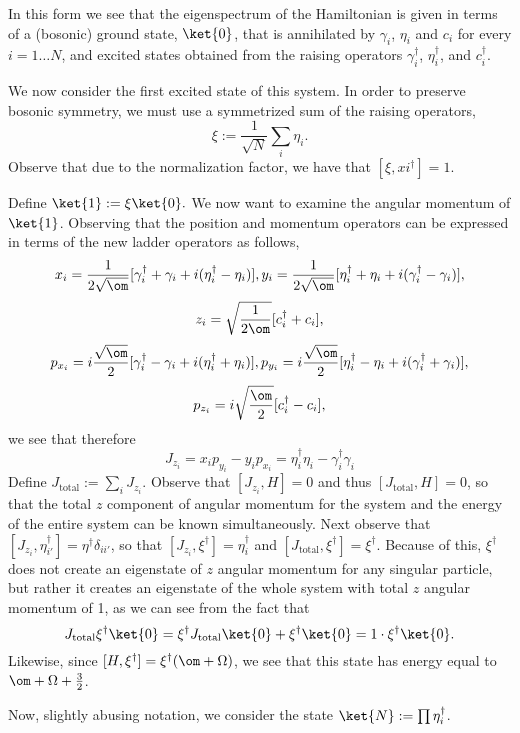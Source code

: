 \documentclass{article}
\begin{document}
In this form we see that the eigenspectrum of the Hamiltonian is given in terms of a (bosonic) ground state, $\ket{0}$, that is annihilated by $\gamma_i$, $\eta_i$ and $c_i$ for every $i=1\dots N$, and excited states obtained from the raising operators $\gamma_i^\dagger$, $\eta_i^\dagger$, and $c_i^\dagger$.

We now consider the first excited state of this system.  In order to preserve bosonic symmetry, we must use a symmetrized sum of the raising operators,
$$\xi := \frac{1}{\sqrt{N}}\sum_i \eta_i.$$  Observe that due to the normalization factor, we have that $[\xi,xi^\dagger] = 1$.

Define $\ket{1}:= \xi\ket{0}.$  We now want to examine the angular momentum of $\ket{1}$.  Observing that the position and momentum operators can be expressed in terms of the new ladder operators as follows,
$$
x_i = \frac{1}{2\sqrt{\om}}[\gamma_i^\dagger + \gamma_i+ i(\eta_i^\dagger-\eta_i)],
y_i = \frac{1}{2\sqrt{\om}}[\eta_i^\dagger + \eta_i+ i(\gamma_i^\dagger-\gamma_i)],
$$
$$
z_i = \sqrt{\frac{1}{2\om}}[c_i^\dagger + c_i],
$$
$$
p_{x_i} = i\frac{\sqrt{\om}}{2}[\gamma_i^\dagger - \gamma_i + i(\eta_i^\dagger + \eta_i)],
p_{y_i} =i\frac{\sqrt{\om}}{2}[\eta_i^\dagger - \eta_i + i(\gamma_i^\dagger +\gamma_i)],
$$
$$
p_{z_i} =i\sqrt{\frac{\om}{2}}[c_i^\dagger - c_i],
$$
we see that therefore
$$
J_{z_i}=x_i p_{y_i} - y_i p_{x_i} = \eta_i^\dagger\eta_i - \gamma_i^\dagger\gamma_i
$$
Define $J_{\text{total}}:=\sum_i J_{z_i}$.  Observe that $[J_{z_i},H]=0$ and thus $[J_{\text{total}},H]=0$, so that the total $z$ component of angular momentum for the system and the energy of the entire system can be known simultaneously.  Next observe that $[J_{z_i},\eta_{i'}^\dagger]=\eta^\dagger \delta_{ii'}$, so that $[J_{z_i},\xi^\dagger]=\eta_i^\dagger$ and $[J_{\text{total}},\xi^\dagger]=\xi^\dagger$.  Because of this, $\xi^\dagger$ does not create an eigenstate of $z$ angular momentum for any singular particle, but rather it creates an eigenstate of the whole system with total $z$ angular momentum of 1, as we can see from the fact that
$$J_{\text{total}} \xi^\dagger \ket{0} = \xi^\dagger J_{\text{total}} \ket{0} + \xi^\dagger \ket{0} = 1\cdot \xi^\dagger \ket{0}.$$
Likewise, since $[H,\xi^\dagger] = \xi^\dagger (\om+\Omega)$, we see that this state has energy equal to $\om+\Omega+\frac{3}{2}$.

Now, slightly abusing notation, we consider the state $\ket{N}:=\prod \eta_i^\dagger$.  
\end{document}
